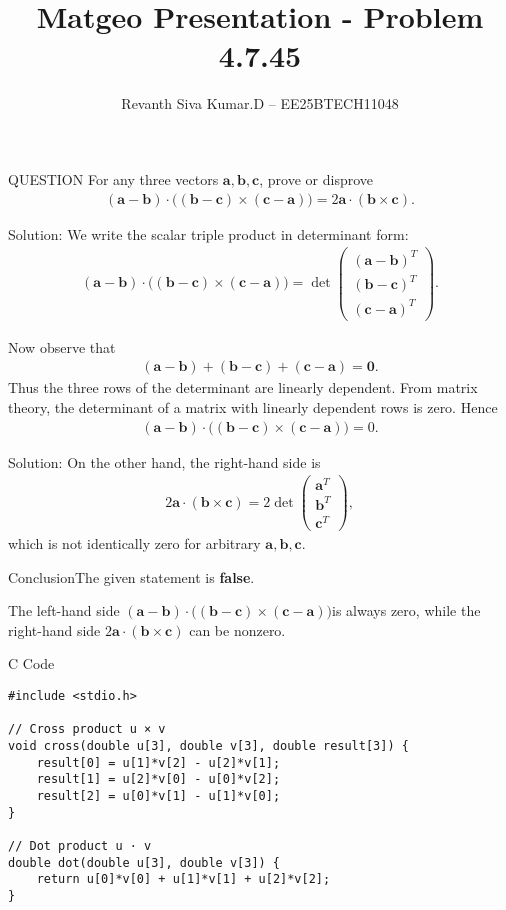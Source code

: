 \documentclass{beamer}
\title{Matgeo Presentation - Problem 4.7.45}
\author{Revanth Siva Kumar.D -- EE25BTECH11048}
\numberwithin{equation}{section}
\newcommand{\myvec}[1]{\ensuremath{\begin{pmatrix}#1\end{pmatrix}}}
\let\vec\mathbf
\begin{document}
\begin{frame}
\titlepage
\end{frame}

\begin{frame}{QUESTION}
For any three vectors $\vec{a},\vec{b},\vec{c}$, prove or disprove
\begin{align*}
    (\vec{a}-\vec{b})\cdot \big((\vec{b}-\vec{c})\times(\vec{c}-\vec{a})\big) = 2\vec{a}\cdot(\vec{b}\times \vec{c}).
\end{align*}\end{frame}

\begin{frame}{Solution:}
We write the scalar triple product in determinant form:
\begin{align}
(\vec{a}-\vec{b})\cdot \big((\vec{b}-\vec{c})\times(\vec{c}-\vec{a})\big)
= \det\myvec{ (\vec{a}-\vec{b})^T \\ (\vec{b}-\vec{c})^T \\ (\vec{c}-\vec{a})^T }.
\end{align}

Now observe that
\begin{align}
(\vec{a}-\vec{b}) + (\vec{b}-\vec{c}) + (\vec{c}-\vec{a}) = \vec{0}.
\end{align}
Thus the three rows of the determinant are linearly dependent. From matrix theory, the determinant of a matrix with linearly dependent rows is zero. Hence
\begin{align}
(\vec{a}-\vec{b})\cdot \big((\vec{b}-\vec{c})\times(\vec{c}-\vec{a})\big) = 0.
\end{align}
\end{frame}
\begin{frame}{Solution:}
On the other hand, the right-hand side is
\begin{align}
2\vec{a}\cdot(\vec{b}\times\vec{c})
= 2\det\myvec{\vec{a}^T \\ \vec{b}^T \\ \vec{c}^T},
\end{align}
which is not identically zero for arbitrary $\vec{a},\vec{b},\vec{c}$.
\end{frame}
\begin{frame}{Conclusion}The given statement is \textbf{false}. 

The left-hand side  $(\vec{a}-\vec{b})\cdot \big((\vec{b}-\vec{c})\times(\vec{c}-\vec{a})\big)$is  always zero, 
while the right-hand side $2\vec{a}\cdot(\vec{b}\times \vec{c})$ can be nonzero.
\end{frame}
\begin{frame}[fragile]{C Code}
\begin{lstlisting}
#include <stdio.h>

// Cross product u × v
void cross(double u[3], double v[3], double result[3]) {
    result[0] = u[1]*v[2] - u[2]*v[1];
    result[1] = u[2]*v[0] - u[0]*v[2];
    result[2] = u[0]*v[1] - u[1]*v[0];
}

// Dot product u · v
double dot(double u[3], double v[3]) {
    return u[0]*v[0] + u[1]*v[1] + u[2]*v[2];
}
\end{lstlisting}
\end{frame}
\end{document}
